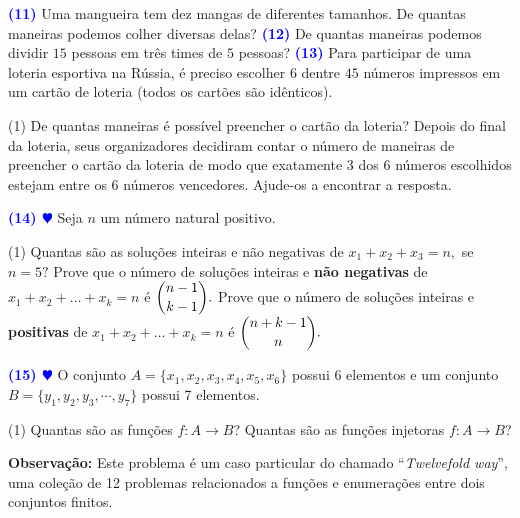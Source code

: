 \documentclass[12pt, a4paper]{article}
\newcommand{\negrito}[1]{\mbox{\boldmath{$#1$}}}
\begin{document}
\newline
\textcolor{blue}{\bf(11)} Uma mangueira tem dez mangas de diferentes tamanhos. De quantas maneiras podemos colher diversas delas?
\newline\newline
\textcolor{blue}{\bf(12)} De quantas maneiras podemos dividir $15$ pessoas em três times de $5$ pessoas?
\newline\newline
\textcolor{blue}{\bf(13)} Para participar de uma loteria esportiva na Rússia, é preciso escolher $6$ dentre $45$ números impressos em um cartão de loteria (todos os cartões são idênticos).
\begin{tasks}[counter-format={(tsk[a])},label-width=3.6ex, label-format = {\bfseries}, column-sep = {0pt}](1)
\task[\textcolor{Floresta}{$\negrito{(a)} $}] De quantas maneiras é possível preencher o cartão da loteria?
\task[\textcolor{Floresta}{$\negrito{(b)} $}] Depois do final da loteria, seus organizadores decidiram contar o número de maneiras de preencher o cartão da loteria de modo que exatamente $3$ dos $6$ números escolhidos estejam entre os $6$ números vencedores. Ajude-os a encontrar a resposta.
\end{tasks} 
\textcolor{blue}{\bf(14) $\varheart$} Seja $n$ um número natural positivo. 
\begin{tasks}[counter-format={(tsk[a])},label-width=3.6ex, label-format = {\bfseries}, column-sep = {0pt}](1)
\task[\textcolor{Floresta}{$\negrito{(a)} $}] Quantas são as soluções inteiras e não negativas de $x_1 + x_2 + x_3 = n,$ se $n = 5?$
\task[\textcolor{Floresta}{$\negrito{(b)} $}] Prove que o número de soluções inteiras e \textbf{não negativas} de $x_1 + x_2 + \ldots + x_k = n$ é $\dbinom{n-1}{k-1}.$
\task[\textcolor{Floresta}{$\negrito{(c)} $}] Prove que o número de soluções inteiras e \textbf{positivas} de $x_1 + x_2 + \ldots + x_k = n$ é $\dbinom{n+k-1}{n}.$
\end{tasks}
\textcolor{blue}{\bf(15) $\varheart$} O conjunto $A=\{x_1,x_2,x_3,x_4,x_5,x_6\}$ possui 6 elementos e um conjunto $B= \{y_1,y_2,y_3,\cdots,y_7\}$ possui 7 elementos.
\begin{tasks}[counter-format={(tsk[a])},label-width=3.6ex, label-format = {\bfseries}, column-sep = {0pt}](1)
\task[\textcolor{Floresta}{$\negrito{(a)} $}] Quantas são as funções $f \colon A \to B$?%
\task[\textcolor{Floresta}{$\negrito{(b)} $}] Quantas são as funções injetoras $f \colon A \to B$?%


\textbf{Observação:} Este problema é um caso particular do chamado ``\textit{Twelvefold way}'', uma coleção de 12 problemas relacionados a funções e enumerações entre dois conjuntos finitos.
\end{tasks}
\end{document}
